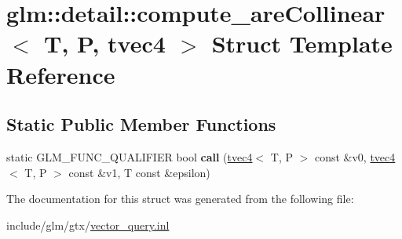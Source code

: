 \hypertarget{structglm_1_1detail_1_1compute__areCollinear_3_01T_00_01P_00_01tvec4_01_4}{}\section{glm\+:\+:detail\+:\+:compute\+\_\+are\+Collinear$<$ T, P, tvec4 $>$ Struct Template Reference}
\label{structglm_1_1detail_1_1compute__areCollinear_3_01T_00_01P_00_01tvec4_01_4}
\subsection*{Static Public Member Functions}
\begin{DoxyCompactItemize}
\item 
\mbox{\label{structglm_1_1detail_1_1compute__areCollinear_3_01T_00_01P_00_01tvec4_01_4_a614f1eb934d5e74a6585898a059cf5a0}} 
static G\+L\+M\+\_\+\+F\+U\+N\+C\+\_\+\+Q\+U\+A\+L\+I\+F\+I\+ER bool {\bfseries call} (\hyperlink{structglm_1_1tvec4}{tvec4}$<$ T, P $>$ const \&v0, \hyperlink{structglm_1_1tvec4}{tvec4}$<$ T, P $>$ const \&v1, T const \&epsilon)
\end{DoxyCompactItemize}


The documentation for this struct was generated from the following file\+:\begin{DoxyCompactItemize}
\item 
include/glm/gtx/\hyperlink{vector__query_8inl}{vector\+\_\+query.\+inl}\end{DoxyCompactItemize}

